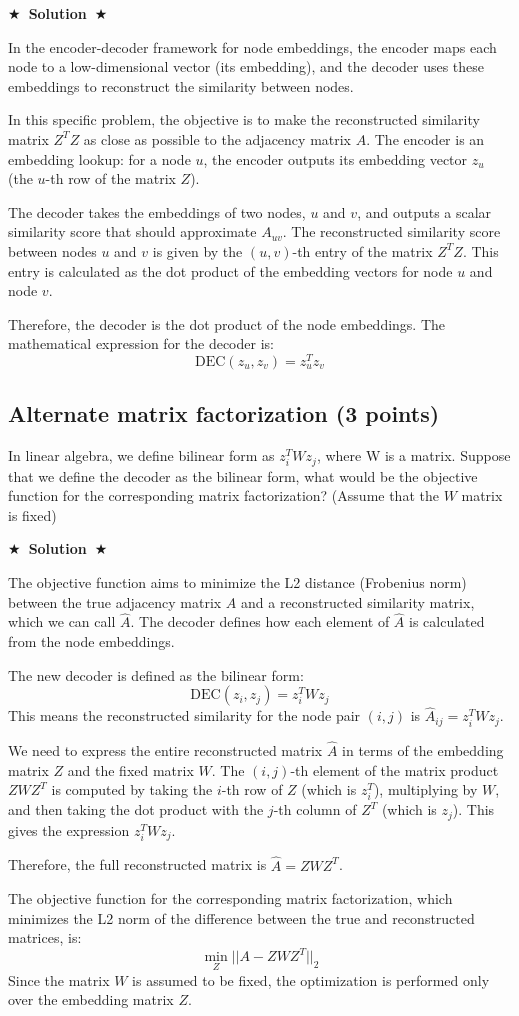 \documentclass{article}
\numberwithin{figure}{section}
\newcommand{\Solution}[1]{%
	{%
		\medskip
		\color{red}
		\bf $\bigstar$~\sf\textbf{Solution}~$\bigstar$ \sf
		#1
	}
	\bigskip
}
\begin{document}
	\Solution{
		In the encoder-decoder framework for node embeddings, the encoder maps each node to a low-dimensional vector (its embedding), and the decoder uses these embeddings to reconstruct the similarity between nodes.
		
		In this specific problem, the objective is to make the reconstructed similarity matrix $Z^TZ$ as close as possible to the adjacency matrix $A$. The encoder is an embedding lookup: for a node $u$, the encoder outputs its embedding vector $z_u$ (the $u$-th row of the matrix $Z$).
		
		The decoder takes the embeddings of two nodes, $u$ and $v$, and outputs a scalar similarity score that should approximate $A_{uv}$. The reconstructed similarity score between nodes $u$ and $v$ is given by the $(u,v)$-th entry of the matrix $Z^TZ$. This entry is calculated as the dot product of the embedding vectors for node $u$ and node $v$.
		
		Therefore, the decoder is the dot product of the node embeddings. The mathematical expression for the decoder is:
		\[ \text{DEC}(z_u, z_v) = z_u^T z_v \]
	}
	
	
	
	\subsection{Alternate matrix factorization (3 points)}
	In linear algebra, we define bilinear form as $z_i^T W z_j$, where W is a matrix. Suppose that we define the decoder as the bilinear form, what would be the objective function for the corresponding matrix factorization? (Assume that the $W$ matrix is fixed)
	
	\Solution{
		The objective function aims to minimize the L2 distance (Frobenius norm) between the true adjacency matrix $A$ and a reconstructed similarity matrix, which we can call $\hat{A}$. The decoder defines how each element of $\hat{A}$ is calculated from the node embeddings.
		
		The new decoder is defined as the bilinear form:
		\[ \text{DEC}(z_i, z_j) = z_i^T W z_j \]
		This means the reconstructed similarity for the node pair $(i, j)$ is $\hat{A}_{ij} = z_i^T W z_j$.
		
		We need to express the entire reconstructed matrix $\hat{A}$ in terms of the embedding matrix $Z$ and the fixed matrix $W$. The $(i,j)$-th element of the matrix product $Z W Z^T$ is computed by taking the $i$-th row of $Z$ (which is $z_i^T$), multiplying by $W$, and then taking the dot product with the $j$-th column of $Z^T$ (which is $z_j$). This gives the expression $z_i^T W z_j$.
		
		Therefore, the full reconstructed matrix is $\hat{A} = Z W Z^T$.
		
		The objective function for the corresponding matrix factorization, which minimizes the L2 norm of the difference between the true and reconstructed matrices, is:
		\[ \min_Z ||A - Z W Z^T||_2 \]
		Since the matrix $W$ is assumed to be fixed, the optimization is performed only over the embedding matrix $Z$.
	}
	
\end{document}
